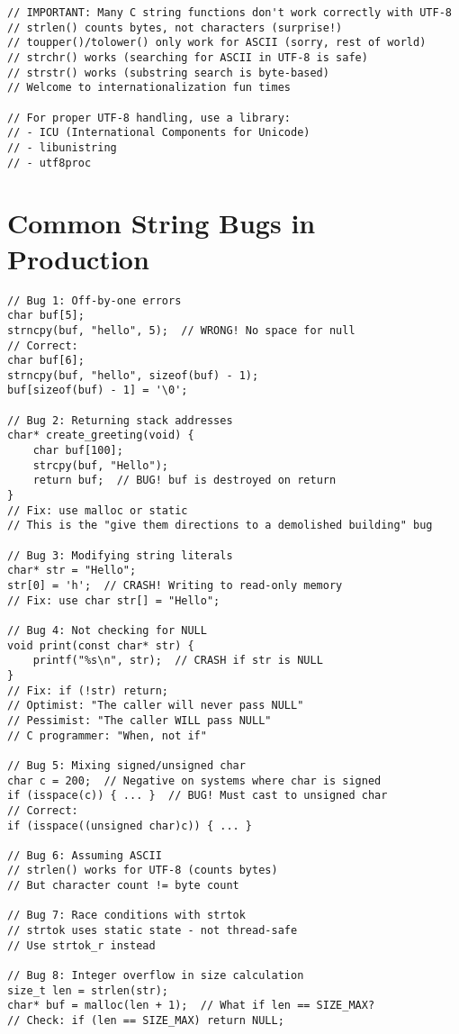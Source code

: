 \begin{lstlisting}
// IMPORTANT: Many C string functions don't work correctly with UTF-8
// strlen() counts bytes, not characters (surprise!)
// toupper()/tolower() only work for ASCII (sorry, rest of world)
// strchr() works (searching for ASCII in UTF-8 is safe)
// strstr() works (substring search is byte-based)
// Welcome to internationalization fun times

// For proper UTF-8 handling, use a library:
// - ICU (International Components for Unicode)
// - libunistring
// - utf8proc
\end{lstlisting}

\section{Common String Bugs in Production}

\begin{lstlisting}
// Bug 1: Off-by-one errors
char buf[5];
strncpy(buf, "hello", 5);  // WRONG! No space for null
// Correct:
char buf[6];
strncpy(buf, "hello", sizeof(buf) - 1);
buf[sizeof(buf) - 1] = '\0';

// Bug 2: Returning stack addresses
char* create_greeting(void) {
    char buf[100];
    strcpy(buf, "Hello");
    return buf;  // BUG! buf is destroyed on return
}
// Fix: use malloc or static
// This is the "give them directions to a demolished building" bug

// Bug 3: Modifying string literals
char* str = "Hello";
str[0] = 'h';  // CRASH! Writing to read-only memory
// Fix: use char str[] = "Hello";

// Bug 4: Not checking for NULL
void print(const char* str) {
    printf("%s\n", str);  // CRASH if str is NULL
}
// Fix: if (!str) return;
// Optimist: "The caller will never pass NULL"
// Pessimist: "The caller WILL pass NULL"
// C programmer: "When, not if"

// Bug 5: Mixing signed/unsigned char
char c = 200;  // Negative on systems where char is signed
if (isspace(c)) { ... }  // BUG! Must cast to unsigned char
// Correct:
if (isspace((unsigned char)c)) { ... }

// Bug 6: Assuming ASCII
// strlen() works for UTF-8 (counts bytes)
// But character count != byte count

// Bug 7: Race conditions with strtok
// strtok uses static state - not thread-safe
// Use strtok_r instead

// Bug 8: Integer overflow in size calculation
size_t len = strlen(str);
char* buf = malloc(len + 1);  // What if len == SIZE_MAX?
// Check: if (len == SIZE_MAX) return NULL;
\end{lstlisting}

